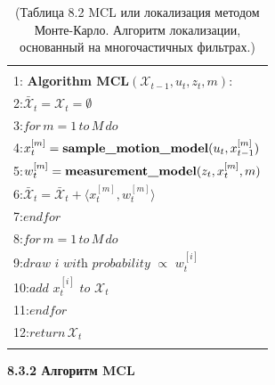 \documentclass[10pt,a4paper]{article}
\begin{document}
\begin{table}[H]
\begin{center}
\begin{tabular}{|l|}
\hline
{}\\
1: \textbf{Algorithm MCL}$(\mathcal{X}_{t-1},u_t,z_t,m):$ \\
2:\hspace{3mm}$\bar{\mathcal{X}}_t=\mathcal{X}_t=\emptyset$\\
3:\hspace{3mm}$\textit{for}\,m=1\,\textit{to}\,M\,\textit{do} $\\
4:\hspace{7mm}$x_t^{[m]}=\text{\textbf{sample\_motion\_model}}(u_t,x_{t-1}^{[m]})$\\
5:\hspace{7mm}$w_t^{[m]}=\text{\textbf{measurement\_model}}(z_t,x_t^{[m]},m)$\\
6:\hspace{7mm}$\bar{\mathcal{X}}_t=\bar{\mathcal{X}}_t+\langle x_t^{[m]},w_t^{[m]}\rangle$\\
7:\hspace{3mm}$\textit{endfor}$\\
8:\hspace{3mm}$\textit{for}\,m=1\,\textit{to}\,M\,\textit{do}$\\
9:\hspace{7mm}$\textit{draw}\,\,i\,\,\textit{with probability}\,\,\propto\,\,w_t^{[i]}$\\
10:\hspace{5mm}$\textit{add}\,\,x_t^{[i]}\,\,\textit{to}\,\,\mathcal{X}_t$\\
11:\hspace{3mm}$\textit{endfor}$\\
12:\hspace{3mm}$\textit{return}\,\mathcal{X}_t$\\
{}\\
\hline
\end{tabular}
\caption{(Таблица 8.2 MCL или локализация методом Монте-Карло. Алгоритм локализации, основанный на многочастичных фильтрах.)}
\end{center}
\end{table}

\textbf{8.3.2	Алгоритм MCL }\\
\end{document}
